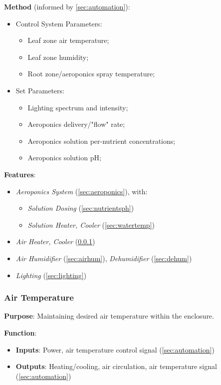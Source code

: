\documentclass{report}
\begin{document}
\textbf{Method} (informed by \ref{sec:automation}):
\begin{itemize}
    \item Control System Parameters:
    \begin{itemize}
        \item Leaf zone air temperature;
        \item Leaf zone humidity;
        \item Root zone/aeroponics spray temperature;
    \end{itemize}
    \item Set Parameters:
    \begin{itemize}
        \item Lighting spectrum and intensity;
        \item Aeroponics delivery/"flow" rate;
        \item Aeroponics solution per-nutrient concentrations;
        \item Aeroponics solution pH;
    \end{itemize}
\end{itemize}

\textbf{Features}:
\begin{itemize}
    \item \textit{Aeroponics System} (\ref{sec:aeroponics}), with:
    \begin{itemize}
        \item \textit{Solution Dosing} (\ref{sec:nutrientsph})
        \item \textit{Solution Heater, Cooler} (\ref{sec:watertemp})
    \end{itemize}
    \item \textit{Air Heater, Cooler} (\ref{sec:airtemp})
    \item \textit{Air Humidifier} (\ref{sec:airhum}), \textit{Dehumidifier} (\ref{sec:dehum})
    \item \textit{Lighting} (\ref{sec:lighting})
\end{itemize}

\newpage

\subsubsection{Air Temperature}
\label{sec:airtemp}

\textbf{Purpose}: Maintaining desired air temperature within the enclosure.

\textbf{Function}:
\begin{itemize}
    \item \textbf{Inputs}: Power, air temperature control signal (\ref{sec:automation})
    \item \textbf{Outputs}: Heating/cooling, air circulation, air temperature signal (\ref{sec:automation})
\end{itemize}
\end{document}
